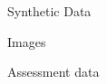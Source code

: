 \documentclass{beamer}
\begin{document}
\begin{frame}{Synthetic Data}

\end{frame}
\begin{frame}{Images}
	
\end{frame}
\begin{frame}{Assessment data}
	
\end{frame}
\end{document}
